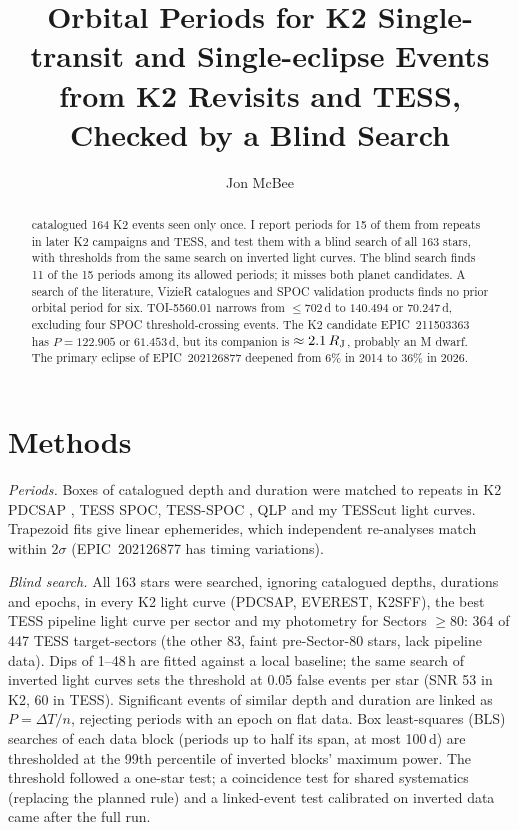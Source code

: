\documentclass{aastex701}
\begin{document}
\title{Orbital Periods for K2 Single-transit and Single-eclipse Events from K2 Revisits and TESS, Checked by a Blind Search}

\author[orcid=0009-0000-7524-4470]{Jon McBee}

\begin{abstract}
\citet{LaCourse2018} catalogued 164 K2 events seen only once. I report periods for 15 of them from
repeats in later K2 campaigns and TESS, and test them with a blind search of all 163 stars, with
thresholds from the same search on inverted light curves. The blind search finds 11 of the 15
periods among its allowed periods; it misses both planet candidates. A search of the literature,
VizieR catalogues and SPOC validation products finds no prior orbital period for six.
TOI-5560.01 narrows from $\leq702$\,d to $140.494$ or $70.247$\,d, excluding four SPOC
threshold-crossing events. The K2 candidate EPIC~211503363 has $P=122.905$ or $61.453$\,d, but
its companion is $\approx2.1\,R_{\rm J}$, probably an M dwarf. The primary eclipse of
EPIC~202126877 deepened from 6\% in 2014 to 36\% in 2026.
\end{abstract}


\section{Methods}

\textit{Periods.} Boxes of catalogued depth and duration were matched to repeats in K2 PDCSAP
\citep{Howell2014}, TESS SPOC, TESS-SPOC \citep{Caldwell2020}, QLP \citep{Huang2020} and my TESScut
\citep{Brasseur2019} light curves. Trapezoid fits give linear ephemerides, which independent
re-analyses match within $2\sigma$ (EPIC~202126877 has timing variations).

\textit{Blind search.} All 163 stars were searched, ignoring catalogued depths, durations and epochs,
in every K2 light curve (PDCSAP, EVEREST, K2SFF), the best TESS pipeline light curve per sector and my
photometry for Sectors $\geq80$: 364 of 447 TESS target-sectors (the other 83, faint
pre-Sector-80 stars, lack pipeline data). Dips of 1--48\,h are fitted against a local baseline; the same search
of inverted light curves sets the threshold at 0.05 false events per star (SNR 53 in K2, 60 in TESS).
Significant events of similar depth and duration are linked as $P=\Delta T/n$, rejecting periods with
an epoch on flat data. Box least-squares (BLS) searches of each data block (periods up to half its
span, at most 100\,d) are thresholded at the 99th percentile of inverted blocks' maximum power. The
threshold followed a one-star test; a coincidence test for shared systematics (replacing the planned
rule) and a linked-event test calibrated on inverted data came after the full run.
\end{document}
